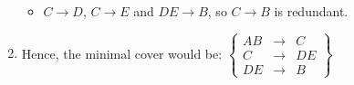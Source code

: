 \documentclass[12pt,letterpaper,titlepage,en-US]{article}
\begin{document}
\begin{homeworkProblem}
\begin{enumerate}[label=\textbf{Step {\arabic*}}, leftmargin=2cm]
\begin{itemize}
                \item $C \rightarrow D$, $C \rightarrow E$ and $DE \rightarrow B$, so $C \rightarrow B$ is redundant.
            \end{itemize}
        \item Hence, the minimal cover would be:
            $\displaystyle\left\{
                    \begin{array}{rcl}
                        AB &\rightarrow& C \\
                        C &\rightarrow& DE \\
                        DE &\rightarrow& B
                    \end{array}
            \right\}$
    \end{enumerate}
\end{homeworkProblem}
\end{document}
